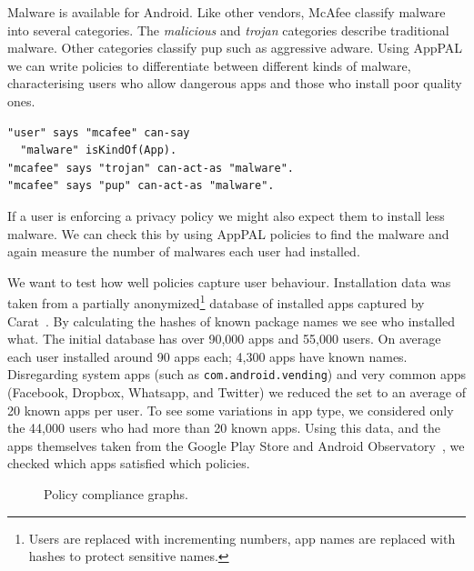 \documentclass[]{llncs}
\begin{document}
Malware is available for Android.
Like other vendors, McAfee classify malware into several categories.
The \emph{malicious} and \emph{trojan} categories describe traditional malware.
Other categories classify \ac{pup} such as aggressive adware.
Using AppPAL we can write policies to differentiate between different kinds of malware, characterising users who allow dangerous apps and those who install poor quality ones.
\begin{lstlisting}
"user" says "mcafee" can-say
  "malware" isKindOf(App).
"mcafee" says "trojan" can-act-as "malware".
"mcafee" says "pup" can-act-as "malware".
\end{lstlisting}
If a user is enforcing a privacy policy we might also expect them to install less malware.
We can check this by using AppPAL policies to find the malware and again measure the number of malwares each user had installed.

We want to test how well policies capture user behaviour.
Installation data was taken from a partially anonymized\footnote{Users are replaced with incrementing numbers, app names are replaced with hashes to protect sensitive names.} database of installed apps captured by Carat~\cite{Oliner:2013ht}.
By calculating the hashes of known package names we see who installed what.
The initial database has over 90,000 apps and 55,000 users.
On average each user installed around 90 apps each; 4,300 apps have known names.
Disregarding system apps (such as \texttt{com.android.vending}) and very common apps (Facebook, Dropbox, Whatsapp, and Twitter) we reduced the set to an average of 20 known apps per user.
To see some variations in app type, we considered only the 44,000 users who had more than 20 known apps.
Using this data, and the apps themselves taken from the Google Play Store and Android Observatory~\cite{Barrera:2012iba}, we checked which apps satisfied which policies.

\begin{figure}\centering
  \caption{Policy compliance graphs.}
\end{figure}
\end{document}
